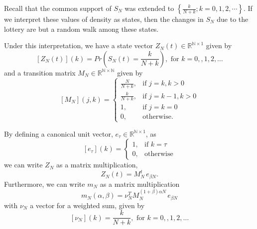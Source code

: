 \documentclass{article}
\newcommand{\N}{\mathbb{N}}
\newcommand{\R}{\mathbb{R}}
\newcommand{\sset}[1]{\left\{ #1 \right\}}
\newcommand{\ppar}[1]{\left( #1 \right)}
\newcommand{\spar}[1]{\left[ #1 \right]}
\begin{document}
Recall that the common support of $S_N$ was extended  to $\sset{\frac{k}{N+k}; k = 0, 1, 2, \cdots}$.
If we interpret these values of density as states, then the changes in $S_N$ due to the lottery are but a random walk among these states.

Under this interpretation, we have a state vector $Z_N(t) \in \R^{\N\times 1}$ given by
\begin{equation}
    \spar{Z_N(t)}(k) = Pr\ppar{S_N(t) = \frac{k}{N+k}}, \text{ for } k=0,,1, 2, \dots
\end{equation}
and a transition matrix $M_N\in \R^{\N\times \N}$ given by
\begin{equation}
    \spar{M_N}(j,k) = 
    \begin{cases}
        \frac{N}{N+k}, &\text{if } j= k, k>0 \\
        \frac{k}{N+k}, &\text{if } j= k-1, k>0 \\
        1, &\text{if } j= k=0 \\
        0, &\text{otherwise.}
    \end{cases}
\end{equation}

By defining a canonical unit vector, $e_\tau \in \R^{\N\times 1}$, as
\begin{equation}
    \spar{e_\tau}(k) =
    \begin{cases}
        1, &\text{if } k=\tau \\
        0, &\text{otherwise}
    \end{cases}
\end{equation}
we can write $Z_N$ as a matrix multiplication,
\begin{equation}
    Z_N(t) = M_N^t\, e_{\beta N}.
\end{equation}
Furthermore, we can write $m_N$ as a matrix multiplication
\begin{equation}
    m_N(\alpha, \beta) = \nu_N^T M_N^{(1+\beta) \alpha N}\, e_{\beta N}
    \label{eq:eq1}
\end{equation}
with $\nu_N$ a vector for a weighted sum, given by
\begin{equation}
    \spar{\nu_N}(k) = \frac{k}{N+k}, \text{ for } k=0,,1, 2, \dots
\end{equation}
\end{document}
